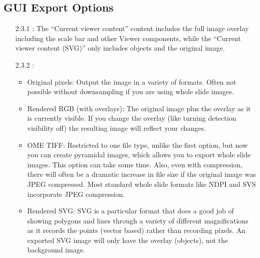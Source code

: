 \documentclass[a4paper,12pt]{article}
\begin{document}
\subsection{GUI Export Options}
\begin{enumerate}
    \item[2.3.1] \soln {} \solnend: %
    The “Current viewer content” content includes the full image overlay including the scale bar and other Viewer components, while the “Current viewer content (SVG)” only includes objects and the original image.
    \item[2.3.2] \soln {} \solnend: 
    \begin{itemize}
        \item Original pixels: Output the image in a variety of formats. Often not possible without downsampling if you are using whole slide images.
        \item Rendered RGB (with overlays): The original image plus the overlay as it is currently visible. If you change the overlay (like turning detection visibility off) the resulting image will reflect your changes.
        \item OME TIFF: Restricted to one file type, unlike the first option, but now you can create pyramidal images, which allows you to export whole slide images. This option can take some time. Also, even with compression, there will often be a dramatic increase in file size if the original image was JPEG compressed. Most standard whole slide formats like NDPI and SVS incorporate JPEG compression. 
        \item Rendered SVG: SVG is a particular format that does a good job of showing polygons and lines through a variety of different magnifications as it records the points (vector based) rather than recording pixels. An exported SVG image will only have the overlay (objects), not the background image.
    \end{itemize}

\end{enumerate}
\end{document}
